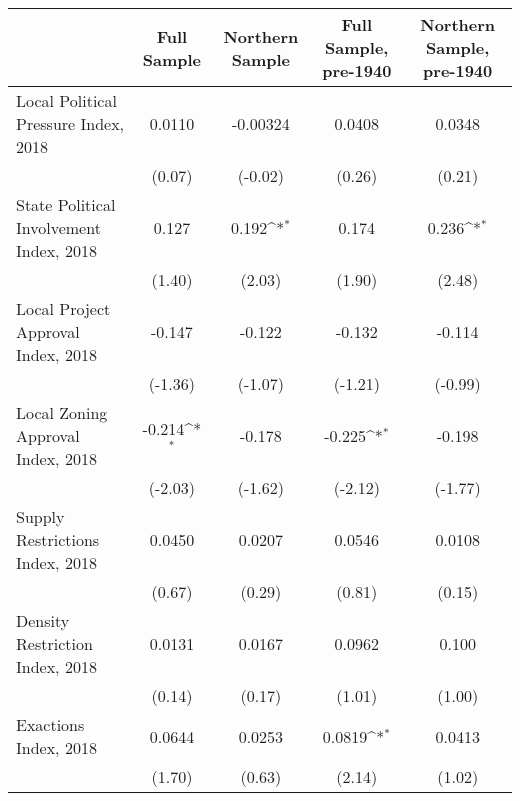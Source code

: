 \begin{table}[htbp]\centering
\def\sym#1{\ifmmode^{#1}\else\(^{#1}\)\fi}
\caption{ \label{tab1}}
\begin{tabular}{l*{4}{c}}
\toprule
                    &\multicolumn{1}{c}{Full Sample}&\multicolumn{1}{c}{Northern Sample}&\multicolumn{1}{c}{Full Sample, pre-1940}&\multicolumn{1}{c}{Northern Sample, pre-1940}\\
\midrule
Local Political Pressure Index, 2018&      0.0110         &    -0.00324         &      0.0408         &      0.0348         \\
                    &      (0.07)         &     (-0.02)         &      (0.26)         &      (0.21)         \\
\addlinespace
State Political Involvement Index, 2018&       0.127         &       0.192\sym{*}  &       0.174         &       0.236\sym{*}  \\
                    &      (1.40)         &      (2.03)         &      (1.90)         &      (2.48)         \\
\addlinespace
Local Project Approval Index, 2018&      -0.147         &      -0.122         &      -0.132         &      -0.114         \\
                    &     (-1.36)         &     (-1.07)         &     (-1.21)         &     (-0.99)         \\
\addlinespace
Local Zoning Approval Index, 2018&      -0.214\sym{*}  &      -0.178         &      -0.225\sym{*}  &      -0.198         \\
                    &     (-2.03)         &     (-1.62)         &     (-2.12)         &     (-1.77)         \\
\addlinespace
Supply Restrictions Index, 2018&      0.0450         &      0.0207         &      0.0546         &      0.0108         \\
                    &      (0.67)         &      (0.29)         &      (0.81)         &      (0.15)         \\
\addlinespace
Density Restriction Index, 2018&      0.0131         &      0.0167         &      0.0962         &       0.100         \\
                    &      (0.14)         &      (0.17)         &      (1.01)         &      (1.00)         \\
\addlinespace
Exactions Index, 2018&      0.0644         &      0.0253         &      0.0819\sym{*}  &      0.0413         \\
                    &      (1.70)         &      (0.63)         &      (2.14)         &      (1.02)         \\

\end{tabular}
\end{table}
